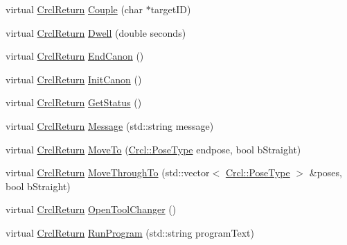 \begin{DoxyCompactItemize}
\item 
virtual \hyperlink{namespaceCrcl_a1ed3b29723118a020251dde9b12733c0}{Crcl\-Return} \hyperlink{classCrcl_1_1CrclDelegateInterface_a5c4272b12bfcbd390d3c9baa3a858e73}{Couple} (char $\ast$target\-I\-D)
\item 
virtual \hyperlink{namespaceCrcl_a1ed3b29723118a020251dde9b12733c0}{Crcl\-Return} \hyperlink{classCrcl_1_1CrclDelegateInterface_a0202e19f87f1609889820ce3dc7e2aa3}{Dwell} (double seconds)
\item 
virtual \hyperlink{namespaceCrcl_a1ed3b29723118a020251dde9b12733c0}{Crcl\-Return} \hyperlink{classCrcl_1_1CrclDelegateInterface_a401c506a2e16f1498fb28a638f0a816a}{End\-Canon} ()
\item 
virtual \hyperlink{namespaceCrcl_a1ed3b29723118a020251dde9b12733c0}{Crcl\-Return} \hyperlink{classCrcl_1_1CrclDelegateInterface_ace91dcb602e1aa5a45bdf8bbcec38391}{Init\-Canon} ()
\item 
virtual \hyperlink{namespaceCrcl_a1ed3b29723118a020251dde9b12733c0}{Crcl\-Return} \hyperlink{classCrcl_1_1CrclDelegateInterface_a695656a7cdcb0ec121fabeb8847e47f2}{Get\-Status} ()
\item 
virtual \hyperlink{namespaceCrcl_a1ed3b29723118a020251dde9b12733c0}{Crcl\-Return} \hyperlink{classCrcl_1_1CrclDelegateInterface_a24d05f3f6758ff75df04ef4ef6260fae}{Message} (std\-::string message)
\item 
virtual \hyperlink{namespaceCrcl_a1ed3b29723118a020251dde9b12733c0}{Crcl\-Return} \hyperlink{classCrcl_1_1CrclDelegateInterface_ac04c8af185b4465add0654b47d3b4ce3}{Move\-To} (\hyperlink{namespaceCrcl_acc6c82b52280f4d0e74b82a92400956e}{Crcl\-::\-Pose\-Type} endpose, bool b\-Straight)
\item 
virtual \hyperlink{namespaceCrcl_a1ed3b29723118a020251dde9b12733c0}{Crcl\-Return} \hyperlink{classCrcl_1_1CrclDelegateInterface_aa7b40e1070284dc5ca9069eb1ea7026d}{Move\-Through\-To} (std\-::vector$<$ \hyperlink{namespaceCrcl_acc6c82b52280f4d0e74b82a92400956e}{Crcl\-::\-Pose\-Type} $>$ \&poses, bool b\-Straight)
\item 
virtual \hyperlink{namespaceCrcl_a1ed3b29723118a020251dde9b12733c0}{Crcl\-Return} \hyperlink{classCrcl_1_1CrclDelegateInterface_a0b78b935f64602c8543dd4cb6a6929ba}{Open\-Tool\-Changer} ()
\item 
virtual \hyperlink{namespaceCrcl_a1ed3b29723118a020251dde9b12733c0}{Crcl\-Return} \hyperlink{classCrcl_1_1CrclDelegateInterface_a524e770e96afe3fd89fd11d70e56cbe3}{Run\-Program} (std\-::string program\-Text)
\item 

\end{DoxyCompactItemize}

